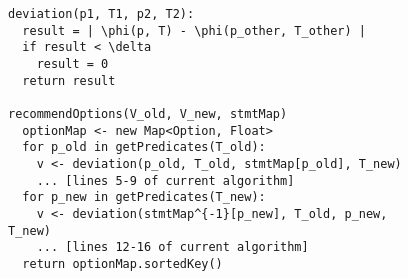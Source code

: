 \begin{figure}[t]


\begin{Verbatim}
deviation(p1, T1, p2, T2):
  result = | \phi(p, T) - \phi(p_other, T_other) |
  if result < \delta
    result = 0
  return result

recommendOptions(V_old, V_new, stmtMap)
  optionMap <- new Map<Option, Float>
  for p_old in getPredicates(T_old):
    v <- deviation(p_old, T_old, stmtMap[p_old], T_new)
    ... [lines 5-9 of current algorithm]
  for p_new in getPredicates(T_new):
    v <- deviation(stmtMap^{-1}[p_new], T_old, p_new, T_new)
    ... [lines 12-16 of current algorithm]
  return optionMap.sortedKey()
\end{Verbatim}

\end{figure}


